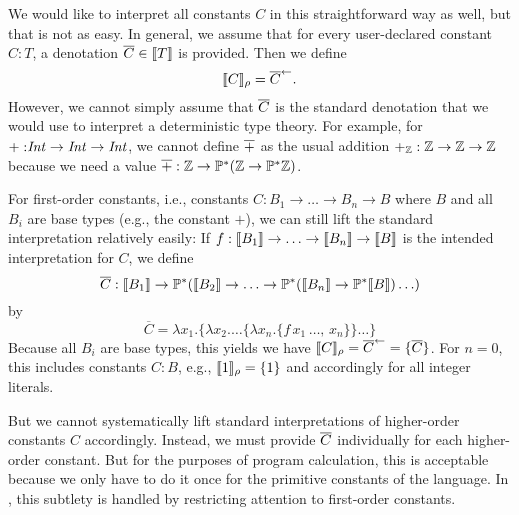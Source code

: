 \documentclass{llncs}
\newcommand{\Conid}[1]{\mathit{#1}}
\begin{document}
We would like to interpret all constants \ensuremath{\Conid{C}} in this straightforward way as well, but that 
is not as easy. In general, we assume that for every user-declared constant $C:T$, a denotation 
$\overline{C}\in\llbracket T\rrbracket$ is provided. Then we define 
\[\llbracket C\rrbracket_{\rho}=\overline{C}^\leftarrow.\]
However, we cannot simply assume that $\overline{C}$ is the standard denotation that we would use 
to interpret a deterministic type theory.
For example, for \ensuremath{\mathbin{+:}\Conid{Int}\hsarrow{\rightarrow }{\mathpunct{.}}\Conid{Int}\hsarrow{\rightarrow }{\mathpunct{.}}\Conid{Int}}, we cannot define $\overline{+}$ as the usual addition $+_{\mathbb{Z}}:\mathbb{Z}\to\mathbb{Z}\to\mathbb{Z}$ because we need a value $\overline{+}:\mathbb{Z}\to\mathbb{P^*}(\mathbb{Z}\to\mathbb{P^*}\mathbb{Z})$.

For first-order constants, i.e., constants $C:B_1\to \ldots\to B_n\to B$ where $B$ and all $B_i$ are base types (e.g., the constant $+$), we can still lift the standard interpretation relatively easily:
If $f:\llbracket B_1\rrbracket\to\ldots\to\llbracket B_n\rrbracket\to\llbracket B\rrbracket$ is the intended interpretation for $C$, we define
\[\overline{C}:\llbracket B_1\rrbracket\to\mathbb{P^*}(\llbracket B_2\rrbracket\to\ldots\to\mathbb{P^*}(\llbracket B_n\rrbracket\to\mathbb{P^*}\llbracket B\rrbracket)\ldots)\]
by
\[\overline{C}=\lambda x_1.\{\lambda x_2.\ldots \{\lambda x_n.\{f \,x_1\,\ldots,\,x_n\}\}\ldots\}\]
Because all $B_i$ are base types, this yields we have $\llbracket C\rrbracket_{\rho}=\overline{C}^\leftarrow=\{\overline{C}\}$.
For $n=0$, this includes constants $C:B$, e.g., $\llbracket1\rrbracket_{\rho}=\{1\}$ and accordingly for all integer literals.

But we cannot systematically lift standard interpretations of higher-order constants $C$ accordingly.
Instead, we must provide $\overline{C}$ individually for each higher-order constant.
But for the purposes of program calculation, this is acceptable because we only have to do it once for the primitive constants of the language.
In \cite{m&b}, this subtlety is handled by restricting attention to first-order constants.

\end{document}
